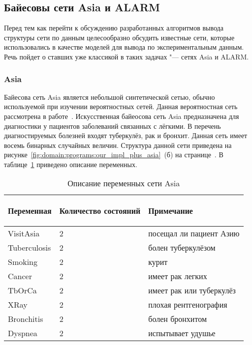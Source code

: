 \subsection{Байесовы сети Asia и ALARM}
\label{sub:arch_and_mod:asia_and_alarm}

Перед тем как перейти к обсуждению разработанных алгоритмов вывода структуры сети по данным целесообразно обсудить известные сети, которые использовались в качестве моделей для вывода по экспериментальным данным.
Речь пойдет о ставших уже классикой в таких задачах "--- сетях Asia и ALARM.

\subsubsection{Asia }
\label{sub:arch_and_mod:asia_and_alarm:asia}

Байесова сеть Asia является небольшой синтетической сетью, обычно используемой при изучении вероятностных сетей.
Данная вероятностная сеть рассмотрена в работе~\cite{Lauritzen_Spiegelhalter88}.
Искусственная байеосова сеть Asia предназначена для диагностики у пациентов заболеваний связанных с лёгкими.
В перечень диагностируемых болезней входят туберкулёз, рак и бронхит.
Данная сеть имеет восемь бинарных случайных величин.
Структура данной сети приведена на рисунке~\ref{fig:domain:programs:our_impl_plus_asia}~(б) на странице~\pageref{fig:domain:programs:our_impl_plus_asia}.
В таблице~\ref{table:arch_and_mod:asia_and_alarm:asia:vars} приведено описание переменных.

\begin{table}[ht]
\caption{Описание переменных сети Asia}
\label{table:arch_and_mod:asia_and_alarm:asia:vars}
\centering
  \begin{tabular}{| >{\raggedright}m{}
                  | >{\centering}m{}
                  | >{\raggedright\arraybackslash}m{}|}
  \hline Переменная & Количество состояний & \begin{center} Примечание \end{center} \\
  \hline VisitAsia & \num{2} & посещал ли пациент Азию \\
  \hline Tuberculosis & \num{2} & болен туберкулёзом \\
  \hline Smoking & \num{2} & курит \\
  \hline Cancer & \num{2} & имеет рак легких \\
  \hline TbOrCa & \num{2} & имеет рак или туберкулёз \\
  \hline XRay & \num{2} & плохая рентгенография \\
  \hline Bronchitis & \num{2} & болен бронхитом \\
  \hline Dyspnea & \num{2} & испытывает удушье \\
  \hline
  \end{tabular}
\end{table}


